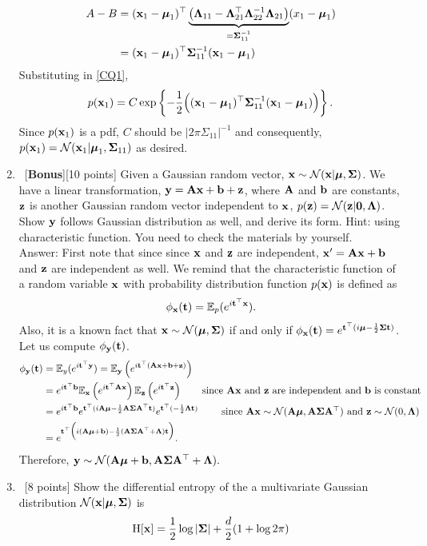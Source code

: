 \documentclass[12pt, fullpage,letterpaper]{article}
\def\red{\color{red}}
\def\blackblue{\color{black!40!blue}}
\begin{document}
\begin{enumerate}
{\begin{align*}
A - B 
& = ({\bf x}_1-\boldsymbol{\mu}_1)^\top \underbrace{\left(\mathbf{\Lambda}_{11}- \mathbf{\Lambda}_{21}^\top\mathbf{\Lambda}_{22}^{-1}\mathbf{\Lambda}_{21}\right)}_{=\boldsymbol{\Sigma}_{11}^{-1}}(x_1-\boldsymbol{\mu}_1)\\
& = ({\bf x}_1-\boldsymbol{\mu}_1)^\top\boldsymbol{\Sigma}_{11}^{-1} ({\bf x}_1-\boldsymbol{\mu}_1)
\end{align*}
Substituting in \ref{CQ1}, 
$$p({\bf x}_1) = C\exp\left\{-\frac12 \Big(({\bf x}_1-\boldsymbol{\mu}_1)^\top\boldsymbol{\Sigma}_{11}^{-1} ({\bf x}_1-\boldsymbol{\mu}_1)\Big)\right\}.$$
Since $p({\bf x}_1)$ is a pdf, $C$ should be $|2\pi\Sigma_{11}|^{-1}$ and consequently, 
$p({\bf x}_1) = \mathcal{N}({\bf x}_1| \boldsymbol{\mu}_1, \boldsymbol{\Sigma}_{11})$ as desired. 
}
\item~[\textbf{Bonus}][10 points] Given a Gaussian random vector, ${\bf x} \sim \mathcal{N}({\bf x}|\boldsymbol{\mu}, \boldsymbol{\Sigma})$.  We have a linear transformation, ${\bf y} = {\bf A}{\bf x} + {\bf b} + {\bf z}$, where ${\bf A}$ and ${\bf b}$ are constants, ${\bf z}$ is another Gaussian random vector independent to ${\bf x}$, $p({\bf z}) = \mathcal{N}({\bf z}|{\bf 0}, \mathbf{\Lambda})$. Show ${\bf y}$ follows Gaussian distribution as well, and derive its form. Hint: using characteristic function. You need to check the materials by yourself. \\
{\red Answer: }{\blackblue  
First note that since since ${\bf x}$ and ${\bf z}$ are independent,  ${\bf x}' = {\bf A}{\bf x} + {\bf b}$ and ${\bf z}$ are independent as well. 
We remind that the characteristic function of a random variable ${\bf x}$ with probability distribution function $p({\bf x})$ is defined as
$$\phi_{\bf x}({\bf t}) = \mathbb{E}_p(e^{i{\bf t}^\top{\bf x}}).$$
Also, it is a known fact that ${\bf x}\sim \mathcal{N}(\boldsymbol{\mu}, \boldsymbol{\Sigma})$ if and only if $\phi_{\bf x}({\bf t}) = e^{{\bf t}^\top(i\boldsymbol{\mu} - \frac{1}{2}\boldsymbol{\Sigma}{\bf t})}$.
Let us compute $\phi_{\bf y}({\bf t})$.
\begin{align*}
\phi_{\bf y}({\bf t}) & =  \mathbb{E}_y(e^{i{\bf t}^\top{\bf y}})=  \mathbb{E}_{\bf y}\left(e^{i{\bf t}^\top({\bf A}{\bf x} + {\bf b} + {\bf z})}\right)\\
 & =  e^{i{\bf t}^\top{\bf b}}\mathbb{E}_{\bf x}\left(e^{i{\bf t}^\top{\bf A}{\bf x} }\right)\mathbb{E}_{\bf z}\left(e^{i{\bf t}^\top {\bf z}}\right)\qquad \mbox{since ${\bf A}{\bf x}$ and ${\bf z}$ are independent and ${\bf b}$ is constant} \\
& = e^{i{\bf t}^\top{\bf b}}  e^{{\bf t}^\top(i{\bf A}\boldsymbol{\mu} - \frac{1}{2}{\bf A}\boldsymbol{\Sigma} {\bf A}^\top{\bf t})}   e^{{\bf t}^\top(- \frac{1}{2}\mathbf{\Lambda}{\bf t})} \qquad
\mbox{ since ${\bf A}{\bf x} \sim \mathcal{N}({\bf A}\boldsymbol{\mu}, {\bf A}\boldsymbol{\Sigma}{\bf A}^\top)$ and ${\bf z}\sim \mathcal{N}(0,\mathbf{\Lambda})$}\\
& = e^{{\bf t}^\top\Big(i({\bf A}\boldsymbol{\mu} + {\bf b}) -\frac12 ({\bf A}\boldsymbol{\Sigma}{\bf A}^\top+\mathbf{\Lambda}){\bf t} \Big)}.
\end{align*} 
Therefore, ${\bf y} \sim \mathcal{N}({\bf A}\boldsymbol{\mu} + {\bf b}, {\bf A}\boldsymbol{\Sigma}{\bf A}^\top+\mathbf{\Lambda}).$
}
\item~[8 points] Show the differential entropy of the a multivariate Gaussian distribution $\mathcal{N}({\bf x}|\boldsymbol{\mu}, \boldsymbol{\Sigma})$ is
\[
\mathrm{H}[{\bf x}] = \frac{1}{2}\log |\boldsymbol{\Sigma}| + \frac{d}{2}(1 + \log 2\pi)
\]
\end{enumerate}
\end{document}
